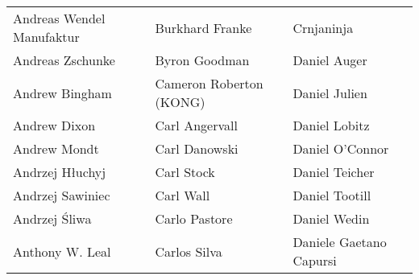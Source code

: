 \begin{tabular}{p{4.5cm}p{4.5cm}p{4.5cm}}
Andreas Wendel Manufaktur & Burkhard Franke & Crnjaninja \\
Andreas Zschunke & Byron Goodman & Daniel Auger \\
Andrew Bingham & Cameron Roberton (KONG) & Daniel Julien \\
Andrew Dixon & Carl Angervall & Daniel Lobitz \\
Andrew Mondt & Carl Danowski & Daniel O'Connor \\
Andrzej Hłuchyj & Carl Stock & Daniel Teicher \\
Andrzej Sawiniec & Carl Wall & Daniel Tootill \\
Andrzej Śliwa & Carlo Pastore & Daniel Wedin \\
Anthony W. Leal & Carlos Silva & Daniele Gaetano Capursi \\
\end{tabular}
\newpage
\setlength{\tabcolsep}{1mm}
